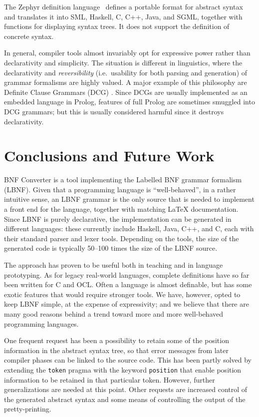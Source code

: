 The Zephyr definition language 
\cite{zephyr}\ defines a portable format for abstract syntax
and translates it into SML, Haskell, C, C++,
Java, and SGML, together with functions for displaying syntax trees. 
It does not support the definition of concrete syntax.

In general, compiler tools almost invariably opt for expressive power 
rather than declarativity and simplicity.
The situation is different in linguistics, where
the declarativity and \textit{reversibility} (i.e.\ usability for both
parsing and generation) of grammar formalisms are highly valued. A major 
example of this philosophy are Definite Clause Grammars (DCG) 
\cite{dcg}. Since DCGs are usually implemented as an embedded 
language in Prolog, 
features of full Prolog are sometimes smuggled into DCG grammars;
but this is usually considered harmful since it destroys
declarativity.

\section{Conclusions and Future Work}

BNF Converter is a tool implementing the Labelled BNF grammar formalism
(LBNF). Given that a programming language is
``well-behaved'', in a rather intuitive sense, an
LBNF grammar is the only source that is needed to implement
a front end for the language, together with matching
LaTeX documentation. Since LBNF is purely declarative, 
the implementation can be generated in different languages:
these currently include Haskell, Java, C++, and C, each with
their standard parser and lexer tools. Depending on
the tools, the size of the generated code is typically 
50--100 times the size of the LBNF source.

The approach has proven to be useful both in teaching and
in language prototyping. As for legacy real-world languages, 
complete definitions have so far been written for C and OCL.
Often a language is almost definable, but has some
exotic features that would require stronger tools.
We have, however, opted to keep LBNF simple, at the expense
of expressivity; and we believe that there are many good reasons
behind a trend toward
more and more well-behaved programming languages.


One frequent request has been a possibility to retain
some of the position information  
in the abstract syntax tree, so that error messages from later
compiler phases can be linked to the source code.
This has been partly solved by extending the \texttt{token} 
pragma with the keyword \texttt{position} that enable position 
information to be retained in that particular token. However,
further generalizations are needed at this point. Other requests 
are increased control of the generated abstract syntax and some 
means of controlling the output of the pretty-printing. 




% 

%
